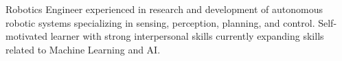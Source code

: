 

\begin{cvparagraph}

Robotics Engineer experienced in research and development of autonomous robotic systems specializing in sensing, perception, planning, and control. Self-motivated learner with strong interpersonal skills currently expanding skills related to Machine Learning and AI.
\end{cvparagraph}
